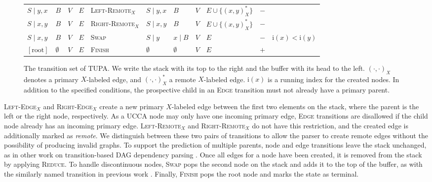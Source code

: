 \documentclass[11pt,a4paper]{article}
\newcommand{\parser}[1]{TUPA\textsubscript{#1}}
\begin{document}
\begin{figure*}
\begin{adjustbox}{width=\textwidth,margin=3pt,frame}
\begin{tabular}{llll|l|llllc|c}
$S \;|\; y,x$ & $B$ & $V$ & $E$ & \textsc{Left-Remote$_X$} & $S \;|\; y,x$ & $B$ & $V$ & $E \cup \{ (x,y)_X^* \}$ & $-$ & \\
$S \;|\; x,y$ & $B$ & $V$ & $E$ & \textsc{Right-Remote$_X$} & $S \;|\; x,y$ & $B$ & $V$ & $E \cup \{ (x,y)_X^* \}$ & $-$ & \\
$S \;|\; x,y$ & $B$ & $V$ & $E$ & \textsc{Swap} & $S \;|\; y$ & $x \;|\; B$ & $V$ & $E$ & $-$ &
$\mathrm{i}(x) < \mathrm{i}(y)$ \\
$[\mathrm{root}]$ & $\emptyset$ & $V$ & $E$ & \textsc{Finish} & $\emptyset$ & $\emptyset$ & $V$ & $E$ & $+$ & \\
\end{tabular}
\end{adjustbox}
\caption{\label{fig:transitions}
  The transition set of \parser{}. %
  We write the stack with its top to the right and the buffer with its head to the left.
  $(\cdot,\cdot)_X$ denotes a primary $X$-labeled edge, and $(\cdot,\cdot)_X^*$ a remote $X$-labeled edge.
  $\mathrm{i}(x)$ is a running index for the created nodes.
  In addition to the specified conditions,
  the prospective child in an \textsc{Edge} transition must not already have a primary parent.
}
\end{figure*}

\textsc{Left-Edge$_X$} and \textsc{Right-Edge$_X$} create a new primary $X$-labeled edge between the first two elements on the stack, where the parent is the left or the right node, respectively.
As a UCCA node may only have one incoming primary edge,
\textsc{Edge} transitions are disallowed if the child node already
has an incoming primary edge.
\textsc{Left-Remote$_X$} and \textsc{Right-Remote$_X$} do not have this restriction,
and the created edge is additionally marked as \textit{remote}.
We distinguish between these two pairs of transitions to allow the parser to create remote edges
without the possibility of producing invalid graphs.
To support the prediction of multiple parents, node and edge transitions
leave the stack unchanged, as in other work on
transition-based DAG dependency parsing
\cite{sagae2008shift,ribeyre-villemontedelaclergerie-seddah:2014:SemEval,tokgoz2015transition}.
Once all edges for a node have been created, it is removed from the stack
by applying \textsc{Reduce}.
To handle discontinuous nodes, \textsc{Swap} pops the second
node on the stack and adds it to the top of the buffer, as with the similarly
named transition in previous work \cite{nivre2009non,maier2015discontinuous}.
Finally, \textsc{Finish} pops the root node and marks the state as terminal.
\end{document}
